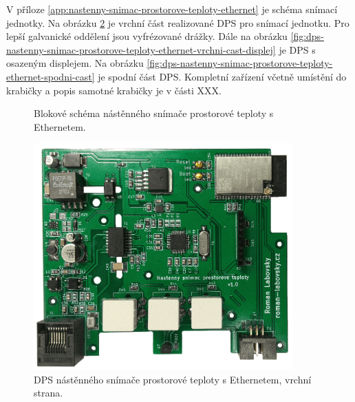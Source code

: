 V příloze \ref{app:nastenny-snimac-prostorove-teploty-ethernet} je schéma snímací jednotky. Na obrázku \ref{fig:dps-nastenny-snimac-prostorove-teploty-ethernet-vrchni-cast} je vrchní část realizované DPS pro snímací jednotku. Pro lepší galvanické oddělení jsou vyfrézované drážky. Dále na obrázku \ref{fig:dps-nastenny-snimac-prostorove-teploty-ethernet-vrchni-cast-displej} je DPS s osazeným displejem. Na obrázku \ref{fig:dps-nastenny-snimac-prostorove-teploty-ethernet-spodni-cast} je spodní část DPS. Kompletní zařízení včetně umístění do krabičky a popis samotné krabičky je v části XXX.

\begin{figure}[H]
    \centering
    \def\svgwidth{\columnwidth}
    
    \caption[]{Blokové schéma nástěnného snímače prostorové teploty s Ethernetem.}
    \label{fig:blokove-schema-nastenny-snimac-teploty-ethernet}
\end{figure}

\begin{figure}[H]
    \centering
    \includegraphics[width=0.89\textwidth]{images/nastenny-snimac-prostorove-teploty-ethernet/dps-nastenny-snimac-prostorove-teploty-ethernet-vrchni-cast.png}
    \caption{DPS nástěnného snímače prostorové teploty s Ethernetem, vrchní strana.}
    \label{fig:dps-nastenny-snimac-prostorove-teploty-ethernet-vrchni-cast}
\end{figure}

